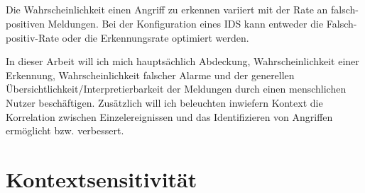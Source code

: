 \subsection{}
Die Wahrscheinlichkeit einen Angriff zu erkennen variiert mit der Rate an falsch-positiven Meldungen. Bei der Konfiguration eines IDS kann entweder die Falsch-positiv-Rate oder die Erkennungsrate optimiert werden.

 

In dieser Arbeit will ich mich hauptsächlich Abdeckung, Wahrscheinlichkeit einer Erkennung, Wahrscheinlichkeit falscher Alarme und der generellen Übersichtlichkeit/Interpretierbarkeit der Meldungen durch einen menschlichen Nutzer beschäftigen. Zusätzlich will ich beleuchten inwiefern Kontext die Korrelation zwischen Einzelereignissen und das Identifizieren von Angriffen ermöglicht bzw. verbessert.
\section{Kontextsensitivität}